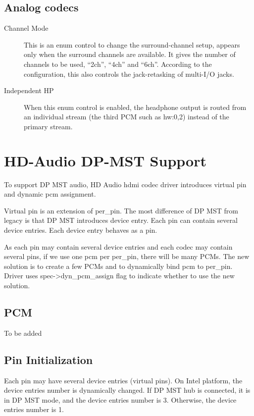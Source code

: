 \documentclass[a4paper,8pt,english]{sphinxmanual}
\begin{document}
\subsection{Analog codecs}
\label{sound/hd-audio/controls:analog-codecs}\begin{description}
\item[{Channel Mode}] \leavevmode
This is an enum control to change the surround-channel setup,
appears only when the surround channels are available.
It gives the number of channels to be used, ``2ch'', ``4ch'' and ``6ch''.
According to the configuration, this also controls the
jack-retasking of multi-I/O jacks.

\item[{Independent HP}] \leavevmode
When this enum control is enabled, the headphone output is routed
from an individual stream (the third PCM such as hw:0,2) instead of
the primary stream.

\end{description}


\section{HD-Audio DP-MST Support}
\label{sound/hd-audio/dp-mst:hd-audio-dp-mst-support}\label{sound/hd-audio/dp-mst::doc}
To support DP MST audio, HD Audio hdmi codec driver introduces virtual pin
and dynamic pcm assignment.

Virtual pin is an extension of per\_pin. The most difference of DP MST
from legacy is that DP MST introduces device entry. Each pin can contain
several device entries. Each device entry behaves as a pin.

As each pin may contain several device entries and each codec may contain
several pins, if we use one pcm per per\_pin, there will be many PCMs.
The new solution is to create a few PCMs and to dynamically bind pcm to
per\_pin. Driver uses spec-\textgreater{}dyn\_pcm\_assign flag to indicate whether to use
the new solution.


\subsection{PCM}
\label{sound/hd-audio/dp-mst:pcm}
To be added


\subsection{Pin Initialization}
\label{sound/hd-audio/dp-mst:pin-initialization}
Each pin may have several device entries (virtual pins). On Intel platform,
the device entries number is dynamically changed. If DP MST hub is connected,
it is in DP MST mode, and the device entries number is 3. Otherwise, the
device entries number is 1.
\end{document}

